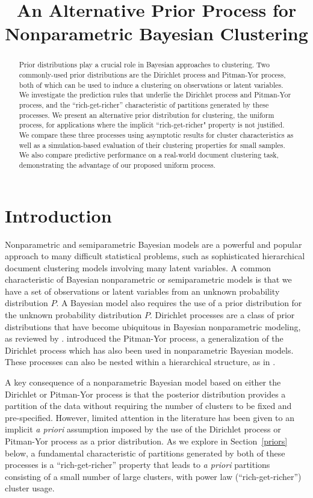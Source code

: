 \documentclass[]{article}
\title{An Alternative Prior Process for Nonparametric Bayesian Clustering}
\author{} %
\begin{document}
 
 
\maketitle 
 
\begin{abstract} 
Prior distributions play a crucial role in Bayesian approaches to
clustering.  Two commonly-used prior distributions are the Dirichlet
process and Pitman-Yor process, both of which can be used to induce a
clustering on observations or latent variables. We investigate the
prediction rules that underlie the Dirichlet process and Pitman-Yor
process, and the ``rich-get-richer'' characteristic of partitions
generated by these processes.  We present an alternative prior
distribution for clustering, the uniform process, for applications
where the implicit ``rich-get-richer" property is not justified. We
compare these three processes using asymptotic results for cluster
characteristics as well as a simulation-based evaluation of their
clustering properties for small samples. We also compare predictive
performance on a real-world document clustering task, demonstrating
the advantage of our proposed uniform process.
\end{abstract} 
 
\section{Introduction}\label{introduction}

Nonparametric and semiparametric Bayesian models are a powerful and
popular approach to many difficult statistical problems, such as
sophisticated hierarchical document clustering models involving many latent
variables.   A common characteristic of Bayesian nonparametric or
semiparametric models is that we have a set of observations or latent
variables from an unknown probability distribution $P$.   A
Bayesian model also requires the use of a prior distribution for the
unknown probability distribution $P$.   Dirichlet processes are a
class of prior distributions that have become ubiquitous in Bayesian
nonparametric modeling, as reviewed by \cite{MulQui04}.   \cite{PitYor97} introduced the Pitman-Yor process, a generalization of the Dirichlet process which has also been used in nonparametric Bayesian models.  These processes can also be nested within a hierarchical structure, as in \cite{TehJorBea06}.   

A key consequence of a nonparametric Bayesian model based on either the Dirichlet or Pitman-Yor process is that the posterior distribution provides a partition of the data without requiring the number of clusters to be fixed and pre-specified.   
However,  limited attention in the literature has been given to an implicit {\it a priori}
assumption imposed by the use of the Dirichlet
process or Pitman-Yor process as a prior distribution. As we explore in
Section~\ref{priors} below, a fundamental characteristic of partitions
generated by both of these processes is a ``rich-get-richer'' property
that leads to {\it a priori} partitions consisting of a small number of
large clusters, with power law (``rich-get-richer'') cluster usage.
\end{document}
